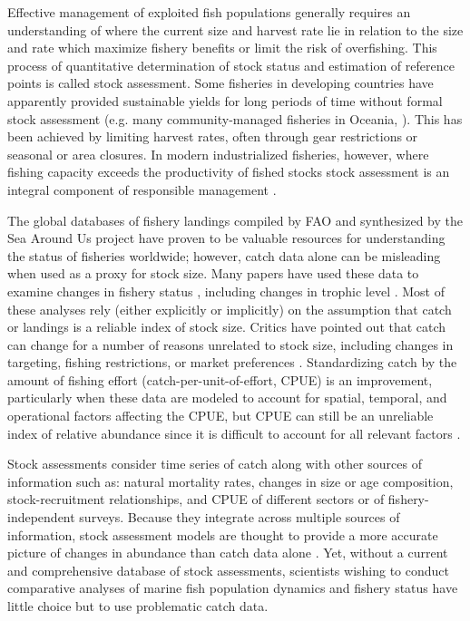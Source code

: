 \documentclass[letterpaper,review,authoryear,12pt]{elsarticle}
\begin{document}
Effective management of exploited fish populations generally requires
an understanding of where the current size and harvest rate
lie in relation to the size and rate which maximize
fishery benefits or limit the risk of overfishing.  This process of
quantitative determination of stock status and estimation of reference
points is called stock assessment.  Some fisheries in developing
countries have apparently provided sustainable yields for long periods
of time without formal stock assessment (e.g. many community-managed
fisheries in Oceania, \citep{Johannes:2002:arees}).  This has been achieved by
limiting harvest rates, often through gear restrictions or seasonal or
area closures.  In modern industrialized fisheries, however, where fishing
capacity exceeds the productivity of fished stocks stock
assessment is an integral component of responsible
management \citep{Hilborn:Walters:1992}.

The global databases of fishery landings compiled by FAO
\citep{FAO:fishstat} and synthesized by the Sea Around Us project
\citep{Watson:etal:2004:fandf} have proven to be valuable resources
for understanding the status of fisheries worldwide; however, catch
data alone can be misleading when used as a proxy for stock size.
Many papers have used these data to examine changes in fishery status
\citep{Worm:etal:2006:science, Costello:etal:2008:science}, including
changes in trophic level \citep{Pauly:etal:1998,
  Essington:etal:2006:procnatacadsci, Newton:etal:2007:currentbiol}.
Most of these analyses rely (either explicitly or implicitly) on the
assumption that catch or landings is a reliable index of stock size.
Critics have pointed out that catch can change for a number of reasons
unrelated to stock size, including changes in targeting, fishing
restrictions, or market preferences \citep{deMutsert:etal:2008:pnas,
  Murawski:Methot:Tromble:2007:science, Hilborn:2007:science}.
Standardizing catch by the amount of fishing effort
(catch-per-unit-of-effort, CPUE) is an improvement, particularly when
these data are modeled to account for spatial, temporal, and
operational factors affecting the CPUE, but CPUE can still be an
unreliable index of relative abundance since it is difficult to
account for all relevant factors \citep{Hutchings:Myers:1994:cjfas,
  Harley:etal:2001:cjfas, Walters:2003:cjfas, Polacheck:2006:marpol}.

Stock assessments consider time series of catch along with other
sources of information such as: natural mortality rates, changes in
size or age composition, stock-recruitment relationships, and CPUE of
different sectors or of fishery-independent surveys.  Because they
integrate across multiple sources of information, stock assessment
models are thought to provide a more accurate picture of changes in
abundance than catch data alone \citep{Sibert:etal:2006:science}. Yet,
without a current and comprehensive database of stock assessments,
scientists wishing to conduct comparative analyses of marine fish
population dynamics and fishery status have little choice but to use
problematic catch data.
\end{document}
